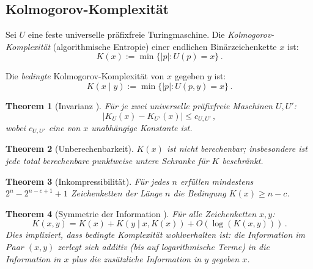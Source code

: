 \documentclass[aps,prd,twocolumn,superscriptaddress,nofootinbib]{revtex4-2}
\newtheorem{theorem}{Theorem}[section]
\theoremstyle{definition}
\theoremstyle{remark}
\begin{document}
\subsection{Kolmogorov-Komplexität}

Sei $U$ eine feste universelle präfixfreie Turingmaschine. Die \textit{Kolmogorov-Komplexität} (algorithmische Entropie) einer endlichen Binärzeichenkette $x$ ist:
\begin{equation}
K(x) := \min\{|p| : U(p) = x\}\,.
\label{eq:kolmogorov}
\end{equation}

Die \textit{bedingte} Kolmogorov-Komplexität von $x$ gegeben $y$ ist:
\begin{equation}
K(x \mid y) := \min\{|p| : U(p, y) = x\}\,.
\label{eq:conditional_K}
\end{equation}

\begin{theorem}[Invarianz {\cite{Kolmogorov1965,Solomonoff1964,Chaitin1966}}]
\label{thm:invariance}
Für je zwei universelle präfixfreie Maschinen $U, U'$:
\begin{equation}
|K_U(x) - K_{U'}(x)| \leq c_{U,U'}\,,
\end{equation}
wobei $c_{U,U'}$ eine von $x$ unabhängige Konstante ist.
\end{theorem}

\begin{theorem}[Unberechenbarkeit]
\label{thm:incomputable}
$K(x)$ ist nicht berechenbar; insbesondere ist jede total berechenbare punktweise untere Schranke für $K$ beschränkt.
\end{theorem}

\begin{theorem}[Inkompressibilität]
\label{thm:incompressible}
Für jedes $n$ erfüllen mindestens $2^n - 2^{n-c+1} + 1$ Zeichenketten der Länge $n$ die Bedingung $K(x) \geq n - c$.
\end{theorem}

\begin{theorem}[Symmetrie der Information {\cite{LiVitanyi2008}}]
\label{thm:symmetry}
Für alle Zeichenketten $x, y$:
\begin{equation}
K(x, y) = K(x) + K(y \mid x, K(x)) + O(\log(K(x, y)))\,.
\end{equation}
Dies impliziert, dass bedingte Komplexität wohlverhalten ist: die Information im Paar $(x, y)$ zerlegt sich additiv (bis auf logarithmische Terme) in die Information in $x$ plus die zusätzliche Information in $y$ gegeben $x$.
\end{theorem}
\end{document}
